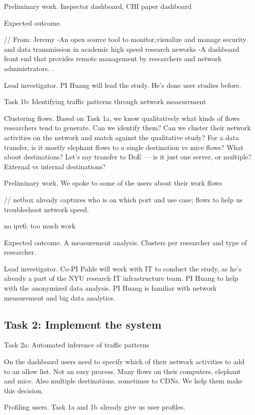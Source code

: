 Preliminary work. Inspector dashboard, CHI paper dashboard

Expected outcome.

// From: Jeremy
-An open source tool to monitor,visualize and manage security and data transmission in academic high speed research neworks
-A dashboard front end that  provides remote management by researchers and network administrators. .

Lead investigator. PI Huang will lead the study. He's done user studies before.

Task 1b: Identifying traffic patterns through network measurement

Clustering flows. Based on Task 1a, we know qualitatively what kinds of flows researchers tend to generate. Can we identify them? Can we cluster their network activities on the network and match against the qualitative study? For a data transfer, is it mostly elephant flows to a single destination vs mice flows? What about destinations? Let's say transfer to DoE — is it just one server, or multiple? External vs internal destinations?

Preliminary work. We spoke to some of the users about their work flows

// netbox already captures who is on which port and use case; flows to help us troubleshoot network speed.

no ipv6; too much work


Expected outcome. A measurement analysis. Clusters per researcher and type of researcher.

Lead investigator. Co-PI Pahle will work with IT to conduct the study, as he's already a part of the NYU research IT infrastructure team. PI Huang to help with the anonymized data analysis. PI Huang is familiar with network measurement and big data analytics.

\subsection{Task 2: Implement the system }

Task 2a: Automated inference of traffic patterns

On the dashboard users need to specify which of their network activities to add to an allow list. Not an easy process. Many flows on their computers, elephant and mice. Also multiple destinations, sometimes to CDNs. We help them make this decision.

Profiling users. Task 1a and 1b already give us user profiles.

